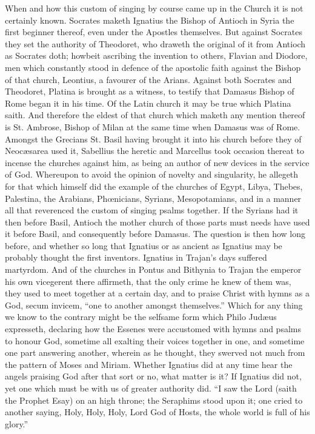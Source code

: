 When and how this custom of singing by course came up in the Church it is not certainly known. Socrates maketh Ignatius the Bishop of Antioch in Syria the first beginner thereof, even under the Apostles themselves. But against Socrates they set the authority of Theodoret, who draweth the original of it from Antioch as Socrates doth; howbeit ascribing the invention to others, Flavian and Diodore, men which constantly stood in defence of the apostolic faith against the Bishop of that church, Leontius, a favourer of the Arians. Against both Socrates and Theodoret, Platina is brought as a witness, to testify that Damasus Bishop of Rome began it in his time. Of the Latin church it may be true which Platina saith. And therefore the eldest of that church which maketh any mention thereof is St. Ambrose, Bishop of  Milan at the same time when Damasus was of Rome. Amongst the Grecians St. Basil having brought it into his church before they of Neocæsarea used it, Sabellius the heretic and Marcellus took occasion thereat to incense the churches against him, as being an author of new devices in the service of God. Whereupon to avoid the opinion of novelty and singularity, he allegeth for that which himself did the example of the churches of Egypt, Libya, Thebes, Palestina, the Arabians, Phœnicians, Syrians, Mesopotamians, and in a manner all that reverenced the custom of singing psalms together. If the Syrians had it then before Basil, Antioch the mother church of those parts must needs have used it before Basil, and consequently before Damasus. The question is then how long before, and whether so long that Ignatius or as ancient as Ignatius may be probably thought the first inventors. Ignatius in Trajan’s days suffered martyrdom. And of the churches in Pontus and Bithynia to Trajan the emperor his own vicegerent there affirmeth, that  the only crime he knew of them was, they used to meet together at a certain day, and to praise Christ with hymns as a God, secum invicem, “one to another amongst themselves.” Which for any thing we know to the contrary might be the selfsame form which Philo Judæus expresseth, declaring how the Essenes were accustomed with hymns and psalms to honour God, sometime all exalting their voices together in one, and sometime one part answering another, wherein as he thought, they swerved not much from the pattern of Moses and Miriam.
Whether Ignatius did at any time hear the angels praising God after that sort or no, what matter is it? If Ignatius did not, yet one which must be with us of greater authority did. “I saw the Lord (saith the Prophet Esay) on an high throne; the Seraphims stood upon it; one cried to another saying, Holy, Holy, Holy, Lord God of Hosts, the whole world is full of his glory.”
